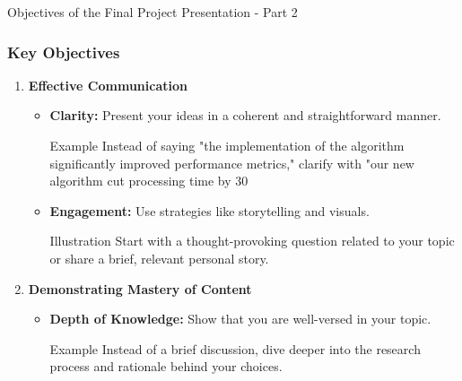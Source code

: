 \documentclass[aspectratio=169]{beamer}
\begin{document}
\begin{frame}[fragile]{Objectives of the Final Project Presentation - Part 2}
    \frametitle{Key Objectives}
    \begin{enumerate}
        \item \textbf{Effective Communication}
            \begin{itemize}
                \item \textbf{Clarity:} Present your ideas in a coherent and straightforward manner.
                    \begin{block}{Example}
                        Instead of saying "the implementation of the algorithm significantly improved performance metrics," clarify with 
                        "our new algorithm cut processing time by 30%
                    \end{block}
                \item \textbf{Engagement:} Use strategies like storytelling and visuals.
                    \begin{block}{Illustration}
                        Start with a thought-provoking question related to your topic or share a brief, relevant personal story.
                    \end{block}
            \end{itemize}

        \item \textbf{Demonstrating Mastery of Content}
            \begin{itemize}
                \item \textbf{Depth of Knowledge:} Show that you are well-versed in your topic.
                    \begin{block}{Example}
                        Instead of a brief discussion, dive deeper into the research process and rationale behind your choices.
                    \end{block}
            \end{itemize}
    \end{enumerate}
\end{frame}
\end{document}
